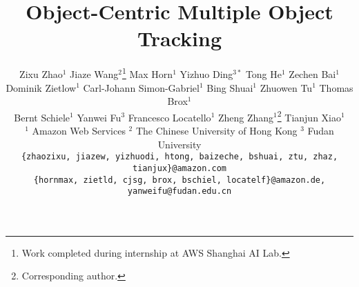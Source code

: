 \documentclass[10pt,twocolumn,letterpaper]{article}
\begin{document}
\title{Object-Centric Multiple Object Tracking}

\author{Zixu Zhao$^{1}$ \quad Jiaze Wang$^{2}$\thanks{Work completed during internship at AWS Shanghai AI Lab.} \quad Max Horn$^{1}$ \quad  Yizhuo Ding$^{3*}$ \quad Tong He$^{1}$ \quad Zechen Bai$^{1}$ \\
Dominik Zietlow$^{1}$ \quad Carl-Johann Simon-Gabriel$^{1}$ \quad Bing Shuai$^{1}$ \quad Zhuowen Tu$^{1}$ \quad Thomas Brox$^{1}$\\ 
 Bernt Schiele$^{1}$ \quad Yanwei Fu$^{3}$ \quad Francesco Locatello$^{1}$ \quad Zheng Zhang$^{1}$\thanks{Corresponding author.} \quad Tianjun Xiao$^{1}$\\
$^{1}$ Amazon Web Services \quad$^{2}$ The Chinese University of Hong Kong \quad  $^{3}$ Fudan University\\
{\tt\small \{zhaozixu, jiazew, yizhuodi, htong, baizeche, bshuai, ztu, zhaz, tianjux\}@amazon.com}\\
{\tt\small \{hornmax, zietld, cjsg, brox, bschiel, locatelf\}@amazon.de, yanweifu@fudan.edu.cn}\\
}


\maketitle
\ificcvfinal\thispagestyle{empty}\fi








{\small


}

\clearpage
\appendix
\renewcommand{\thesection}{\Alph{section}.\arabic{section}}
\setcounter{section}{0}
\end{document}
